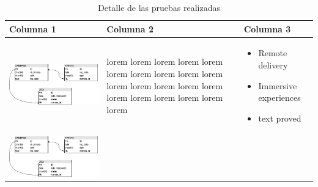 \begin{table}[H]
    \caption{Detalle de las pruebas realizadas}
    \begin{center}
        \begin{tabular}{|>{\centering}p{}|>{\centering}m{}|m{}<{\centering}|} 
            \hline
            \textbf{Columna 1} & \textbf{Columna 2} & \textbf{Columna 3} \\
            \hline
            \begin{minipage}{.3\textwidth}
                \includegraphics[width=\linewidth]{img/capitulo_4/db.png}
            \end{minipage}& lorem lorem lorem lorem lorem lorem lorem lorem lorem lorem lorem lorem lorem lorem lorem lorem lorem lorem lorem lorem lorem
            & \begin{itemize} 
                \item Remote delivery 
                \item Immersive experiences
                \item text proved
            \end{itemize} \\ 
            \hline
            \begin{minipage}{.3\textwidth}
                \includegraphics[width=\linewidth]{img/capitulo_4/db.png}

\end{minipage}
\end{tabular}
\end{center}
\end{table}
